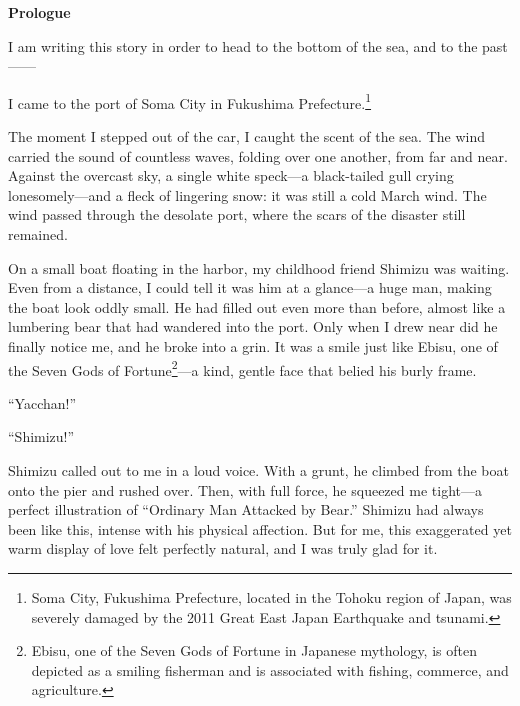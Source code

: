 \documentclass[
    a4paper,
    12pt,
    twoside,
    openany,
    UTF8,
    fontset=windows
]{ctexbook}
\begin{document}
\vspace{2cm}
\clearpage


\setcounter{page}{1}            %

\clearpage
\thispagestyle{plain}
\begin{center}
    \large\bfseries
    Prologue
\end{center}
\label{sec:prologue}
\vspace{1cm}

I am writing this story in order to head to the bottom of the sea, and to the past——

I came to the port of Soma City in Fukushima Prefecture.\footnote{Soma City, Fukushima Prefecture, located in the Tohoku region of Japan, was severely damaged by the 2011 Great East Japan Earthquake and tsunami.}

The moment I stepped out of the car, I caught the scent of the sea. The wind carried the sound of countless waves, folding over one another, from far and near. Against the overcast sky, a single white speck---a black-tailed gull crying lonesomely---and a fleck of lingering snow: it was still a cold March wind. The wind passed through the desolate port, where the scars of the disaster still remained.

On a small boat floating in the harbor, my childhood friend Shimizu was waiting. Even from a distance, I could tell it was him at a glance---a huge man, making the boat look oddly small. He had filled out even more than before, almost like a lumbering bear that had wandered into the port. Only when I drew near did he finally notice me, and he broke into a grin. It was a smile just like Ebisu, one of the Seven Gods of Fortune\footnote{Ebisu, one of the Seven Gods of Fortune in Japanese mythology, is often depicted as a smiling fisherman and is associated with fishing, commerce, and agriculture.}---a kind, gentle face that belied his burly frame.

``Yacchan!''

``Shimizu!''

Shimizu called out to me in a loud voice. With a grunt, he climbed from the boat onto the pier and rushed over. Then, with full force, he squeezed me tight---a perfect illustration of ``Ordinary Man Attacked by Bear.'' Shimizu had always been like this, intense with his physical affection. But for me, this exaggerated yet warm display of love felt perfectly natural, and I was truly glad for it.
\end{document}
